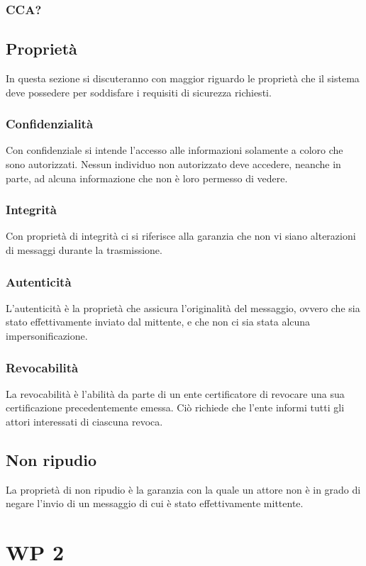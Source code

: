 \documentclass[a4paper,12pt]{article}
\begin{document}
\subsubsection{CCA?}
\subsection{Proprietà}
In questa sezione si discuteranno con maggior riguardo le proprietà che il sistema deve possedere per soddisfare i requisiti di sicurezza richiesti.
\subsubsection{Confidenzialità}
Con confidenziale si intende l'accesso alle informazioni solamente a coloro che sono autorizzati. Nessun individuo non autorizzato deve accedere, neanche in parte, ad alcuna informazione che non è loro permesso di vedere.
\subsubsection{Integrità}
Con proprietà di integrità ci si riferisce alla garanzia che non vi siano alterazioni di messaggi durante la trasmissione. 
\subsubsection{Autenticità}
L'autenticità è la proprietà che assicura l'originalità del messaggio, ovvero che sia stato effettivamente inviato dal mittente, e che non ci sia stata alcuna impersonificazione.
\subsubsection{Revocabilità}
La revocabilità è l'abilità da parte di un ente certificatore di revocare una sua certificazione precedentemente emessa. Ciò richiede che l'ente informi tutti gli attori interessati di ciascuna revoca.
\subsection{Non ripudio}
La proprietà di non ripudio è la garanzia con la quale un attore non è in grado di negare l'invio di un messaggio di cui è stato effettivamente mittente. 
\newpage
\section{WP 2}
\end{document}
